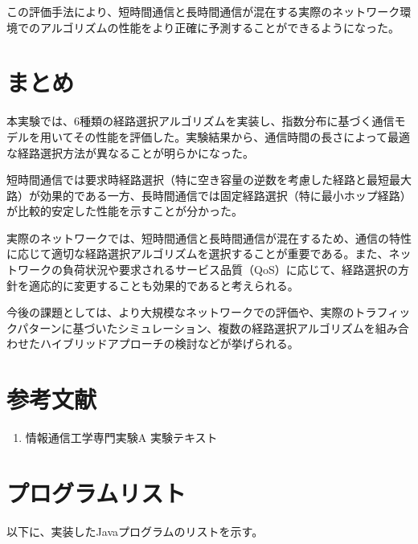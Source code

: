 \documentclass[a4paper,11pt]{jsarticle}
\begin{document}
この評価手法により、短時間通信と長時間通信が混在する実際のネットワーク環境でのアルゴリズムの性能をより正確に予測することができるようになった。

\section{まとめ}
本実験では、6種類の経路選択アルゴリズムを実装し、指数分布に基づく通信モデルを用いてその性能を評価した。実験結果から、通信時間の長さによって最適な経路選択方法が異なることが明らかになった。

短時間通信では要求時経路選択（特に空き容量の逆数を考慮した経路と最短最大路）が効果的である一方、長時間通信では固定経路選択（特に最小ホップ経路）が比較的安定した性能を示すことが分かった。

実際のネットワークでは、短時間通信と長時間通信が混在するため、通信の特性に応じて適切な経路選択アルゴリズムを選択することが重要である。また、ネットワークの負荷状況や要求されるサービス品質（QoS）に応じて、経路選択の方針を適応的に変更することも効果的であると考えられる。

今後の課題としては、より大規模なネットワークでの評価や、実際のトラフィックパターンに基づいたシミュレーション、複数の経路選択アルゴリズムを組み合わせたハイブリッドアプローチの検討などが挙げられる。

\section{参考文献}
\begin{enumerate}
  \item 情報通信工学専門実験A 実験テキスト
\end{enumerate}

\appendix
\section{プログラムリスト}
以下に、実装したJavaプログラムのリストを示す。


\end{document}
